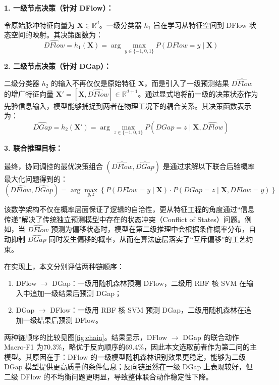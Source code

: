 \documentclass[UTF8,a4paper,12pt]{ctexart}
\begin{document}
\textbf{1. 一级节点决策（针对 DFlow）：}

令原始脉冲特征向量为 $\bm{X} \in \mathbb{R}^d$。一级分类器 $h_1$ 旨在学习从特征空间到 DFlow 状态空间的映射。其决策函数为：
\begin{equation}
    \widehat{DFlow} = h_1(\bm{X}) = \arg\max_{y \in \{-1,0,1\}} P(DFlow = y \mid \bm{X})
\end{equation}

\textbf{2. 二级节点决策（针对 DGap）：}

二级分类器 $h_2$ 的输入不再仅仅是原始特征 $\bm{X}$，而是引入了一级预测结果 $\widehat{DFlow}$ 的增广特征向量 $\bm{X}' = [\bm{X}, \widehat{DFlow}] \in \mathbb{R}^{d+1}$。通过显式地将前一级的决策状态作为先验信息输入，模型能够捕捉到两者在物理工况下的耦合关系。其决策函数表示为：
\begin{equation}
    \widehat{DGap} = h_2(\bm{X}') = \arg\max_{z \in \{-1,0,1\}} P(DGap = z \mid \bm{X}, \widehat{DFlow})
\end{equation}

\textbf{3. 联合推理目标：}

最终，协同调控的最优决策组合 $(\widehat{DFlow}, \widehat{DGap})$ 是通过求解以下联合后验概率最大化问题得到的：
\begin{equation}
    (\widehat{DFlow}, \widehat{DGap}) = \arg\max_{y, z} \left\{ P(DFlow=y \mid \bm{X}) \cdot P(DGap=z \mid \bm{X}, DFlow=y) \right\}
\end{equation}

该数学架构不仅在概率层面保证了逻辑的自洽性，更从特征工程的角度通过“信息传递”解决了传统独立预测模型中存在的状态冲突（Conflict of States）问题。例如，当 $\widehat{DFlow}$ 预测为偏移状态时，模型在第二级推理中会根据条件概率分布，自动抑制 $\widehat{DGap}$ 同时发生偏移的概率，从而在算法底层落实了“互斥偏移”的工艺约束。

在实现上，本文分别评估两种链顺序：
\begin{enumerate}[label=(\arabic*),leftmargin=2em]
\item DFlow $\rightarrow$ DGap：一级用随机森林预测 DFlow，二级用 RBF 核 SVM 在输入中追加一级结果后预测 DGap；
\item DGap $\rightarrow$ DFlow：一级用 RBF 核 SVM 预测 DGap，二级用随机森林在追加一级结果后预测 DFlow。
\end{enumerate}

两种链顺序的比较见图\ref{fig:chain}。结果显示，DFlow $\rightarrow$ DGap 的联合动作 Macro-F1 为70.3\%，略优于反向顺序的69.4\%，因此本文选取前者作为第二问的主模型。其原因在于：DFlow 的一级模型随机森林识别效果更稳定，能够为二级 DGap 模型提供更高质量的条件信息；反向链虽然在一级 DGap 上表现较好，但二级 DFlow 的不均衡问题更明显，导致整体联合动作稳定性下降。
\end{document}
